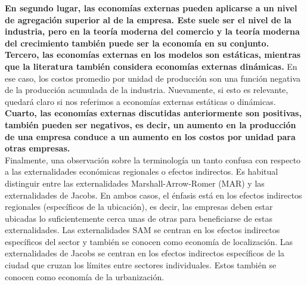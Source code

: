 \textbf{En segundo lugar, las economías externas pueden aplicarse a un nivel de agregación superior al de la empresa. Este suele ser el nivel de la industria, pero en la teoría moderna del comercio y la teoría moderna del crecimiento también puede ser la economía en su conjunto. Tercero, las economías externas en los modelos son estáticas, mientras que la literatura también considera economías externas dinámicas.} En ese caso, los costos promedio por unidad de producción son una función negativa de la producción acumulada de la industria. Nuevamente, si esto es relevante, quedará claro si nos referimos a economías externas estáticas o dinámicas. \textbf{Cuarto, las economías externas discutidas anteriormente son positivas,  también pueden ser negativos, es decir, un aumento en la producción de una empresa conduce a un aumento en los costos por unidad para otras empresas.}\\
Finalmente, una observación sobre la terminología un tanto confusa con respecto a las externalidades económicas regionales o efectos indirectos. Es habitual distinguir entre las externalidades Marshall-Arrow-Romer (MAR) y las externalidades de Jacobs. En ambos casos, el énfasis está en los efectos indirectos regionales (específicos de la ubicación), es decir, las empresas deben estar ubicadas lo suficientemente cerca unas de otras para beneficiarse de estas externalidades. Las externalidades SAM se centran en los efectos indirectos específicos del sector y también se conocen como economía de localización. Las externalidades de Jacobs se centran en los efectos indirectos específicos de la ciudad que cruzan los límites entre sectores individuales. Estos también se conocen como economía de la urbanización. 


